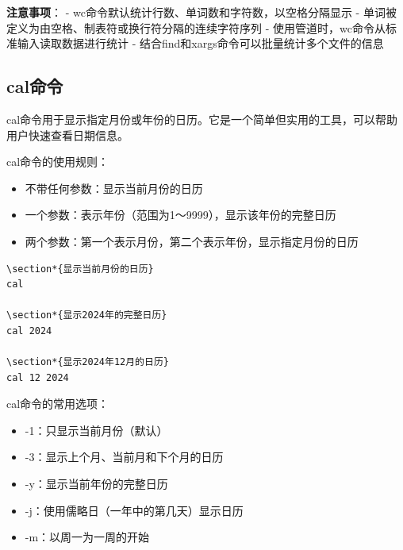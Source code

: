 \documentclass[12pt,UTF8]{ctexbook}
\begin{document}
\textbf{注意事项}：
- wc命令默认统计行数、单词数和字符数，以空格分隔显示
- 单词被定义为由空格、制表符或换行符分隔的连续字符序列
- 使用管道时，wc命令从标准输入读取数据进行统计
- 结合find和xargs命令可以批量统计多个文件的信息

\subsection{cal命令}
cal命令用于显示指定月份或年份的日历。它是一个简单但实用的工具，可以帮助用户快速查看日期信息。

cal命令的使用规则：
\begin{itemize}
    \item 不带任何参数：显示当前月份的日历
    \item 一个参数：表示年份（范围为1～9999），显示该年份的完整日历
    \item 两个参数：第一个表示月份，第二个表示年份，显示指定月份的日历
\end{itemize}

\begin{verbatim}
\section*{显示当前月份的日历}
cal

\section*{显示2024年的完整日历}
cal 2024

\section*{显示2024年12月的日历}
cal 12 2024
\end{verbatim}

cal命令的常用选项：
\begin{itemize}
    \item -1：只显示当前月份（默认）
    \item -3：显示上个月、当前月和下个月的日历
    \item -y：显示当前年份的完整日历
    \item -j：使用儒略日（一年中的第几天）显示日历
    \item -m：以周一为一周的开始
\end{itemize}
\end{document}
